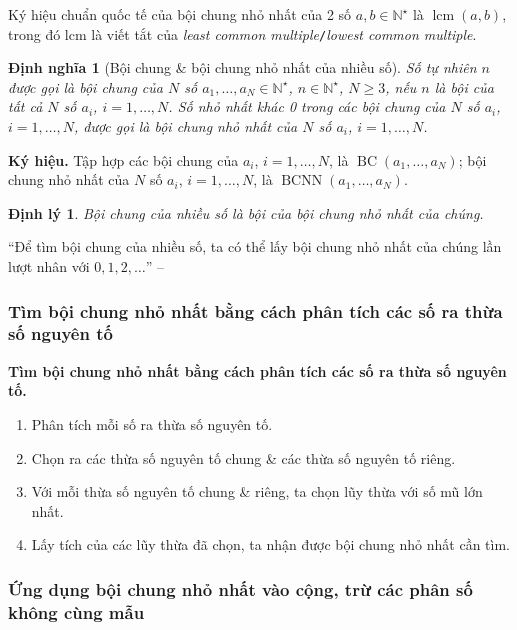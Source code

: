 \documentclass{article}
\numberwithin{equation}{section}
\newtheorem{definition}{Định nghĩa}[section]
\newtheorem{theorem}{Định lý}[section]
\begin{document}
Ký hiệu chuẩn quốc tế của bội chung nhỏ nhất của 2 số $a,b\in\mathbb{N}^\star$ là $\operatorname{lcm}(a,b)$, trong đó lcm là viết tắt của \textit{least common multiple}\texttt{/}\textit{lowest common multiple}.

\begin{definition}[Bội chung \& bội chung nhỏ nhất của nhiều số]
	Số tự nhiên $n$ được gọi là \emph{bội chung} của $N$ số $a_1,\ldots,a_N\in\mathbb{N}^\star$, $n\in\mathbb{N}^\star$, $N\ge 3$, nếu $n$ là bội của tất cả $N$ số $a_i$, $i = 1,\ldots,N$. Số nhỏ nhất khác 0 trong các bội chung của $N$ số $a_i$, $i = 1,\ldots,N$, được gọi là \emph{bội chung nhỏ nhất} của $N$ số $a_i$, $i = 1,\ldots,N$.
\end{definition}
\noindent\textbf{Ký hiệu.} Tập hợp các bội chung của $a_i$, $i = 1,\ldots,N$, là $\operatorname{BC}(a_1,\ldots,a_N)$; bội chung nhỏ nhất của $N$ số $a_i$, $i = 1,\ldots,N$, là $\operatorname{BCNN}(a_1,\ldots,a_N)$.

\begin{theorem}
	Bội chung của nhiều số là bội của bội chung nhỏ nhất của chúng.
\end{theorem}
``Để tìm bội chung của nhiều số, ta có thể lấy bội chung nhỏ nhất của chúng lần lượt nhân với $0,1,2,\ldots$'' -- \cite[p. 55]{Thai_Anh_Dat_Ha_Loan_Nam_Quang_Toan_6_tap_1}

\subsubsection{Tìm bội chung nhỏ nhất bằng cách phân tích các số ra thừa số nguyên tố}

\begin{tcolorbox}
	\textbf{Tìm bội chung nhỏ nhất bằng cách phân tích các số ra thừa số nguyên tố.}
	\begin{enumerate}
		\item Phân tích mỗi số ra thừa số nguyên tố.
		\item Chọn ra các thừa số nguyên tố chung \& các thừa số nguyên tố riêng.
		\item Với mỗi thừa số nguyên tố chung \& riêng, ta chọn lũy thừa với số mũ lớn nhất.
		\item Lấy tích của các lũy thừa đã chọn, ta nhận được bội chung nhỏ nhất cần tìm.
	\end{enumerate}
\end{tcolorbox}

\subsubsection{Ứng dụng bội chung nhỏ nhất vào cộng, trừ các phân số không cùng mẫu}
\end{document}
